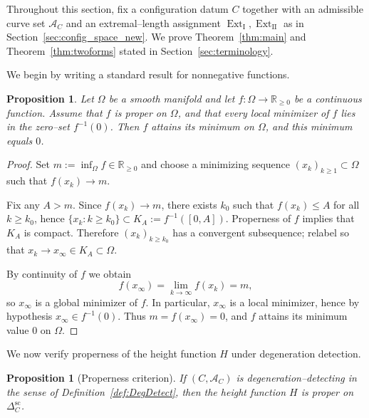 \documentclass[a4paper,12pt]{amsart}
\newcommand{\R}{\mathbb{R}}
\DeclareMathOperator{\Ext}{Ext}
\theoremstyle{plain}
\newtheorem{proposition}[theorem]{Proposition}
\theoremstyle{definition}
\begin{document}
Throughout this section, fix a configuration datum $C$ together with an admissible curve set $\mathcal A_C$ and an
extremal--length assignment $\Ext_{\mathrm{I}},\Ext_{\mathrm{II}}$ as in Section~\ref{sec:config_space_new}.
We prove Theorem~\ref{thm:main} and Theorem~\ref{thm:twoforms} stated in Section~\ref{sec:terminology}.

\medskip

We begin by writing a standard result for nonnegative functions.

\begin{proposition}\label{prop:proper-min}
Let $\Omega$ be a smooth manifold and let $f:\Omega\longrightarrow\R_{\ge 0}$ be a continuous function.
Assume that $f$ is proper on $\Omega$, and that every local minimizer of $f$ lies in the zero--set $f^{-1}(0)$.
Then $f$ attains its minimum on $\Omega$, and this minimum equals $0$.
\end{proposition}

\begin{proof}
Set $m:=\inf_{\Omega} f\in\R_{\ge 0}$ and choose a minimizing sequence $(x_k)_{k\ge 1}\subset \Omega$ such that
$f(x_k)\longrightarrow m$.

Fix any $A>m$. Since $f(x_k)\longrightarrow m$, there exists $k_0$ such that $f(x_k)\le A$ for all $k\ge k_0$, hence
$\{x_k:k\ge k_0\}\subset K_A:=f^{-1}([0,A])$.
Properness of $f$ implies that $K_A$ is compact. Therefore $(x_k)_{k\ge k_0}$ has a convergent subsequence;
relabel so that $x_k\longrightarrow x_\infty\in K_A\subset\Omega$.

By continuity of $f$ we obtain
\[
f(x_\infty)=\lim_{k\longrightarrow\infty} f(x_k)=m,
\]
so $x_\infty$ is a global minimizer of $f$. In particular, $x_\infty$ is a local minimizer, hence by hypothesis
$x_\infty\in f^{-1}(0)$. Thus $m=f(x_\infty)=0$, and $f$ attains its minimum value $0$ on $\Omega$.
\end{proof}

We now verify properness of the height function $H$ under degeneration detection.

\begin{proposition}[Properness criterion]\label{prop:PropernessCriterion}
If $(C,\mathcal A_C)$ is degeneration--detecting in the sense of Definition~\ref{def:DegDetect}, then the
height function $H$ is proper on $\Delta_C^{\mathrm{sc}}$.
\end{proposition}
\end{document}

